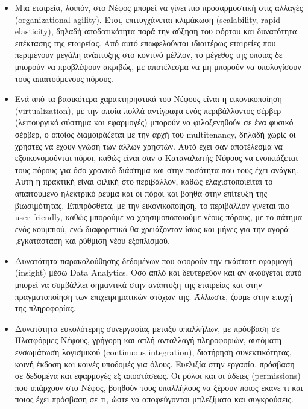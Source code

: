 \documentclass{article}
\begin{document}
\begin{itemize}
\item        Μια εταιρεία, λοιπόν, στο Νέφος μπορεί να γίνει πιο προσαρμοστική
στις αλλαγές (organizational
agility). Έτσι, επιτυγχάνεται κλιμάκωση
(scalability, rapid
elasticity), δηλαδή αποδοτικότητα παρά την αύξηση
του φόρτου και δυνατότητα επέκτασης της εταιρείας. Από αυτό επωφελούνται
ιδιαιτέρως εταιρείες που περιμένουν μεγάλη ανάπτυξης στο κοντινό μέλλον,
το μέγεθος της οποίας δε μπορούν να προβλέψουν ακριβώς, με αποτέλεσμα να
μη μπορούν να υπολογίσουν τους απαιτούμενους πόρους.

\item        Ενά από τα βασικότερα χαρακτηρηστικά του Νέφους είναι η
εικονικοποίηση (virtualization),
με την οποία πολλά αντίγραφα ενός περιβάλλοντος
σέρβερ (λειτουργικό σύστημα και εφαρμογές) μπορούν να φιλοξενηθούν σε ένα
φυσικό σέρβερ, ο οποίος διαμοιράζεται με την αρχή του
multitenancy, δηλαδή χωρίς
οι χρήστες να έχουν γνώση των άλλων χρηστών. Αυτό έχει σαν αποτέλεσμα  να
εξοικονομούνται πόροι, καθώς είναι σαν ο Καταναλωτής Νέφους να
ενοικιάζεται τους πόρους για όσο χρονικό διάστημα και στην ποσότητα που
τους έχει ανάγκη. Αυτή η πρακτική είναι φιλική στο περιβάλλον, καθώς
ελαχιστοποιείται το απαιτούμενο ηλεκτρικό ρεύμα και οι πόροι και βοηθά
στην επίτευξη της βιωσιμότητας. Επιπρόσθετα, με την εικονικοποίηση, το
περιβάλλον γίνεται πιο user
friendly, καθώς μπορούμε να χρησιμοποποιούμε νέους
πόρους, με το πάτημα ενός κουμπιού, ενώ διαφορετικά θα χρειάζονταν ίσως
και μήνες για την αγορά ,εγκατάσταση και ρύθμιση νέου εξοπλισμού.

\item        Δυνατότητα παρακολούθησης δεδομένων που αφορούν την εκάστοτε
εφαρμογή (insight) μέσω
Data Analytics. Όσο απλό και
δευτερεύον και αν ακούγεται αυτό μπορεί να συμβάλλει σημαντικά στην
ανάπτυξη της εταιρείας και στην πραγματοποίηση των επιχειρηματικών στόχων
της. Άλλωστε, ζούμε στην εποχή της πληροφορίας.

\item        Δυνατότητα ευκολότερης συνεργασίας μεταξύ υπαλλήλων, με πρόσβαση σε
Πλατφόρμες Νέφους, γρήγορη και απλή ανταλλαγή πληροφοριών, αυτόματη
ενσωμάτωση λογισμικού (continuous integration),
διατήρηση συνεκτικότητας, κοινή έκδοση και κοινές
υποδομές για όλους. Ευελιξία στην εργασία, πρόσβαση σε δεδομένα και
εφαρμογές εξ αποστάσεως. Οι ρόλοι και οι άδειες
(permissions) που υπάρχουν
στο Νέφος, βοηθούν τους υπαλλήλους να ξέρουν ποιος έκανε τι και ποιος έχει
πρόσβαση σε τι, ώστε να αποφεύγονται μπλεξίματα και συγκρούσεις.


\end{itemize}
\end{document}
